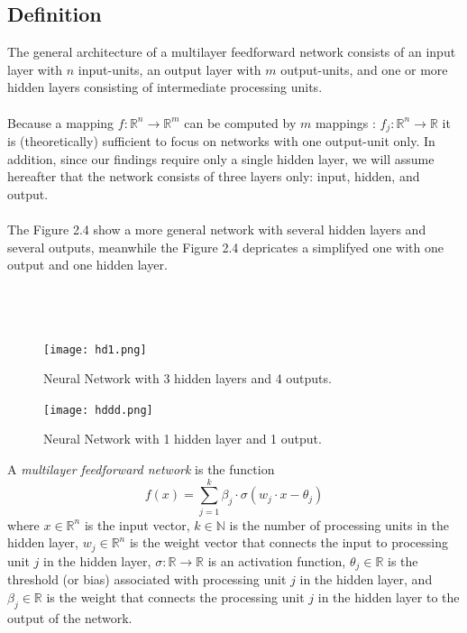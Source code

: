 \documentclass[../main.tex]{subfiles}
\begin{document}
	 \subsection{Definition}
	 \noindent The general architecture of a multilayer feedforward network consists of an input layer with $n$ input-units, an output layer with $m$ output-units, and one or more hidden layers consisting of intermediate processing units. \\ \\ Because a mapping
	 $f:\mathbb{R}^n \rightarrow \mathbb{R}^m$ can be computed by $m$ mappings :
	 $f_j: \mathbb{R}^n \rightarrow \mathbb{R}$ it is (theoretically) sufficient to focus on networks with one output-unit only. In addition, since our findings require only a single hidden layer, we will assume hereafter that the network consists of three layers only: input, hidden, and output. \\ \\
	 The Figure 2.4 show a more general network with several hidden layers and several outputs, meanwhile the Figure 2.4 depricates a simplifyed one with one output and one hidden layer. \\ \\\\\\
	 
	 
	 \begin{figure}[h]
	 	\begin{minipage}[t]{0.45\textwidth}
	 		\centering
	 		\texttt{[image: hd1.png]}
	 		\caption{Neural Network with 3 hidden layers and 4 outputs.}
	 		\label{fig:imagen1}
	 	\end{minipage}\hfill
	 	\begin{minipage}[t]{0.45\textwidth}
	 		\centering
	 		\texttt{[image: hddd.png]}
	 		\caption{Neural Network with 1 hidden layer and 1 output.}
	 		\label{fig:imagen2}
	 	\end{minipage}
	 \end{figure}
	 
	 \begin{definition} A \textit{multilayer feedforward network} is the function
	 	$$f(x)=\sum_{j=1}^k \beta_j \cdot \sigma(w_j \cdot x - \theta_j)$$
	 	where $x \in \mathbb{R}^n$ is the input vector, $k \in \mathbb{N}$ is the number of processing units in the hidden layer, $w_j \in \mathbb{R}^n$ is the weight vector that connects the input to processing unit $j$ in the hidden layer, $\sigma : \mathbb{R} \rightarrow \mathbb{R}$ is an activation function, $\theta_j \in \mathbb{R}$ is the threshold (or bias) associated with processing unit $j$ in the hidden layer, and $\beta_j \in \mathbb{R}$ is the weight that connects the processing unit $j$ in the hidden layer to the output of the network.
	 	
	 	
	 \end{definition}
	 
\end{document}
